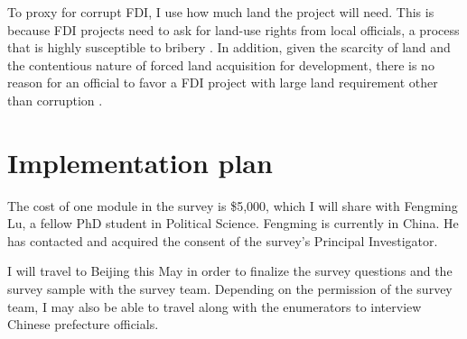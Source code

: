 \documentclass[12pt]{article}
\begin{document}
To proxy for corrupt FDI, I use how much land the project will need. This is because FDI projects need to ask for land-use rights from local officials, a process that is highly susceptible to bribery \citep{USChamberofCommerce2012}. In addition, given the scarcity of land and the contentious nature of forced land acquisition for development, there is no reason for an official to favor a FDI project with large land requirement other than corruption \citep{AmnestyInternational2012}.

\section{Implementation plan}

The cost of one module in the survey is \$5,000, which I will share with Fengming Lu, a fellow PhD student in Political Science. Fengming is currently in China. He has contacted and acquired the consent of the survey's Principal Investigator.

I will travel to Beijing this May in order to finalize the survey questions and the survey sample with the survey team. Depending on the permission of the survey team, I may also be able to travel along with the enumerators to interview Chinese prefecture officials.



\clearpage


\end{document}
